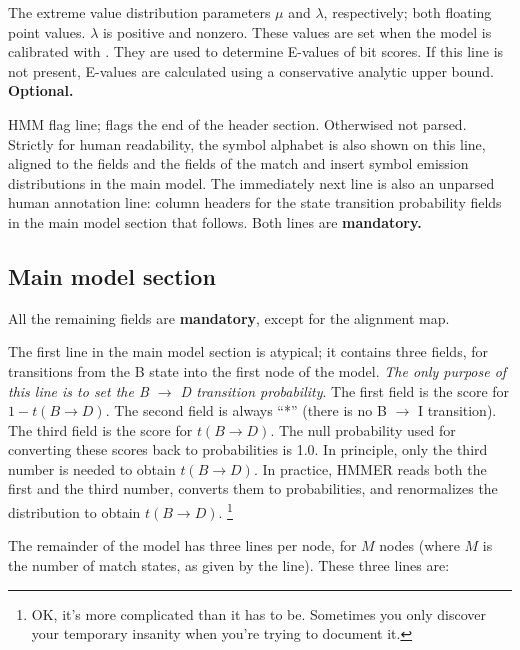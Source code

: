 \begin{wideitem}
\item [\emprog{EVD   <f> <f>}] The extreme value distribution
parameters $\mu$ and $\lambda$, respectively; both floating point
values. $\lambda$ is positive and nonzero. These values are set when
the model is calibrated with . They are used to
determine E-values of bit scores. If this line is not present,
E-values are calculated using a conservative analytic upper bound.
\textbf{Optional.}

\item [\emprog{HMM    }] HMM flag line; flags the end of the header
section. Otherwised not parsed. Strictly for human readability, the
symbol alphabet is also shown on this line, aligned to the 
fields and the fields of the match and insert symbol emission
distributions in the main model. The immediately next line is also an
unparsed human annotation line: column headers for the state
transition probability fields in the main model section that follows.
Both lines are \textbf{mandatory.}

\end{wideitem}

\subsection{Main model section}

All the remaining fields are \textbf{mandatory}, except for the
alignment map.

The first line in the main model section is atypical; it contains
three fields, for transitions from the B state into the first node of
the model. \textit{The only purpose of this line is to set the B
$\rightarrow$ D transition probability}. The first field is the score
for $ 1 - t(B \rightarrow D)$. The second field is always ``*'' (there is no B
$\rightarrow$ I transition). The third field is the score for
$t(B\rightarrow D)$. The null probability used for converting these
scores back to probabilities is 1.0. In principle, only the third
number is needed to obtain $t(B \rightarrow D)$.  In practice, HMMER
reads both the first and the third number, converts them to
probabilities, and renormalizes the distribution to obtain $t(B
\rightarrow D)$. \footnote{OK, it's more complicated than it has to
be. Sometimes you only discover your temporary insanity when you're
trying to document it.}

The remainder of the model has three lines per node, for $M$ nodes
(where $M$ is the number of match states, as given by the 
line). These three lines are:

